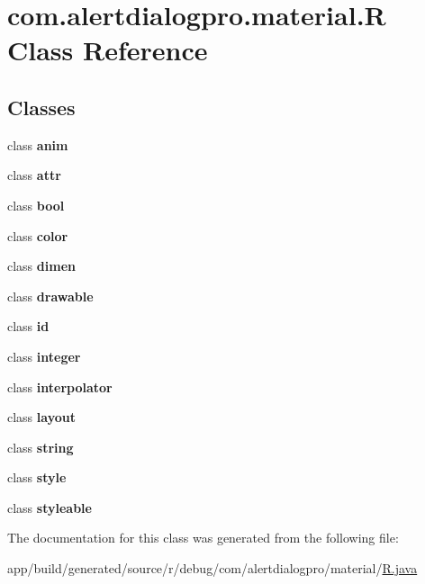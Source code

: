 \hypertarget{classcom_1_1alertdialogpro_1_1material_1_1_r}{}\section{com.\+alertdialogpro.\+material.\+R Class Reference}
\label{classcom_1_1alertdialogpro_1_1material_1_1_r}
\subsection*{Classes}
\begin{DoxyCompactItemize}
\item 
class {\bfseries anim}
\item 
class {\bfseries attr}
\item 
class {\bfseries bool}
\item 
class {\bfseries color}
\item 
class {\bfseries dimen}
\item 
class {\bfseries drawable}
\item 
class {\bfseries id}
\item 
class {\bfseries integer}
\item 
class {\bfseries interpolator}
\item 
class {\bfseries layout}
\item 
class {\bfseries string}
\item 
class {\bfseries style}
\item 
class {\bfseries styleable}
\end{DoxyCompactItemize}


The documentation for this class was generated from the following file\+:\begin{DoxyCompactItemize}
\item 
app/build/generated/source/r/debug/com/alertdialogpro/material/\hyperlink{app_2build_2generated_2source_2r_2debug_2com_2alertdialogpro_2material_2_r_8java}{R.\+java}\end{DoxyCompactItemize}
